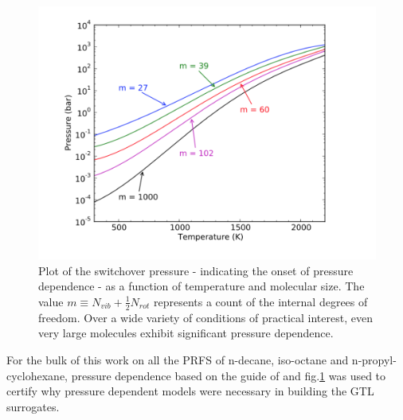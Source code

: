 \begin{figure}[t]
    \centering
    \includegraphics[scale=0.75, keepaspectratio]{images/pdep_limit.png}
    \caption{Plot of the switchover pressure - indicating the onset of pressure dependence - as a function of temperature and molecular size. The value $m\equiv N_{vib}+\frac{1}{2}N_{rot}$ represents a count of the internal degrees of freedom. Over a wide variety of conditions of practical interest, even very large molecules exhibit significant pressure dependence. \cite{Wong2003TemperatureLimit}}
    \label{fig:pdep}
\end{figure}
For the bulk of this work on all the PRFS of n-decane, iso-octane and n-propyl-cyclohexane, pressure dependence based on the guide of \cite{Wong2003TemperatureLimit} and fig.\ref{fig:pdep} was used to certify why pressure dependent models were necessary in building the GTL surrogates.

\vspace{1.5cm}

